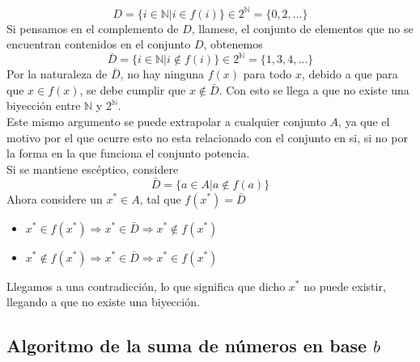 \documentclass[../main.tex]{subfiles}
\begin{document}
\[ D = \{ i \in \mathds{N} | i \in f(i) \} \in 2^{\mathds{N}} = \{ 0, 2, \ldots \} \]
Si pensamos en el complemento de $D$, llamese, el conjunto de elementos que no se encuentran contenidos en el conjunto $D$, obtenemos
\[ \bar{D} = \{ i \in \mathds{N} | i \not\in f(i) \} \in 2^{\mathds{N}} = \{ 1, 3, 4, \ldots \} \]
Por la naturaleza de $\bar{D}$, no hay ninguna $f(x)$ para todo $x$, debido a que para que $x \in f(x)$, se debe cumplir que $x \not\in \bar{D}$. Con esto se llega a que no existe una biyección entre $\mathds{N}$ y $2^{\mathds{N}}$.\\
Este mismo argumento se puede extrapolar a cualquier conjunto $A$, ya que el motivo por el que ocurre esto no esta relacionado con el conjunto en si, si no por la forma en la que funciona el conjunto potencia.\\
Si se mantiene escéptico, considere
\[ \bar{D} = \{ a \in A | a \not\in f(a) \} \]
Ahora considere un $x^* \in A$, tal que $f(x^*) = \bar{D}$
\begin{itemize}
    \item $x^* \in f(x^*) \Rightarrow x^* \in \bar{D} \Rightarrow x^* \not\in f(x^*)$
    \item $x^* \not\in f(x^*) \Rightarrow x^* \in \bar{D} \Rightarrow x^* \in f(x^*)$
\end{itemize}
Llegamos a una contradicción, lo que significa que dicho $x^*$ no puede existir, llegando a que no existe una biyección.

\subsection[Algoritmo de la suma de números en base b]{Algoritmo de la suma de números en base $b$}
\end{document}
